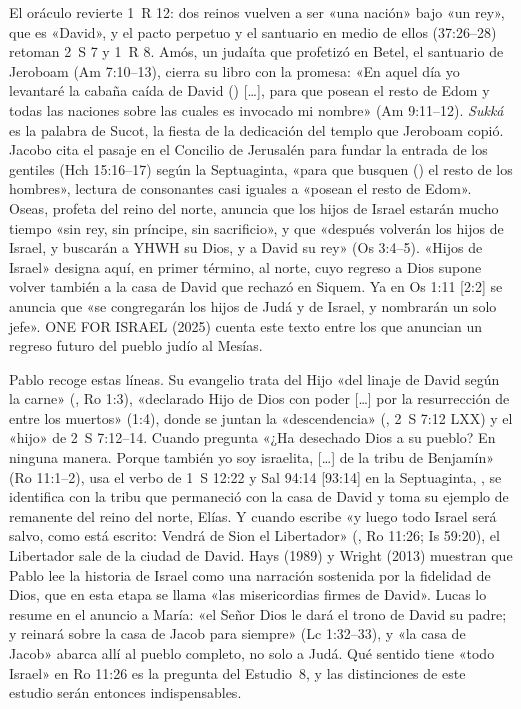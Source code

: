 El oráculo revierte 1~R 12: dos reinos vuelven a ser «una nación» bajo «un rey», que es «David», y el pacto perpetuo y el santuario en medio de ellos (37:26--28) retoman 2~S 7 y 1~R 8. Amós, un judaíta que profetizó en Betel, el santuario de Jeroboam (Am 7:10--13), cierra su libro con la promesa: «En aquel día yo levantaré la cabaña caída de David () [\ldots], para que posean el resto de Edom y todas las naciones sobre las cuales es invocado mi nombre» (Am 9:11--12). \emph{Sukká} es la palabra de Sucot, la fiesta de la dedicación del templo que Jeroboam copió. Jacobo cita el pasaje en el Concilio de Jerusalén para fundar la entrada de los gentiles (Hch 15:16--17) según la Septuaginta, «para que busquen () el resto de los hombres», lectura de consonantes casi iguales a «posean el resto de Edom». Oseas, profeta del reino del norte, anuncia que los hijos de Israel estarán mucho tiempo «sin rey, sin príncipe, sin sacrificio», y que «después volverán los hijos de Israel, y buscarán a YHWH su Dios, y a David su rey» (Os 3:4--5). «Hijos de Israel» designa aquí, en primer término, al norte, cuyo regreso a Dios supone volver también a la casa de David que rechazó en Siquem. Ya en Os 1:11 [2:2] se anuncia que «se congregarán los hijos de Judá y de Israel, y nombrarán un solo jefe». ONE FOR ISRAEL (2025) cuenta este texto entre los que anuncian un regreso futuro del pueblo judío al Mesías.

Pablo recoge estas líneas. Su evangelio trata del Hijo «del linaje de David según la carne» (, Ro 1:3), «declarado Hijo de Dios con poder [\ldots] por la resurrección de entre los muertos» (1:4), donde se juntan la «descendencia» (, 2~S 7:12 LXX) y el «hijo» de 2~S 7:12--14. Cuando pregunta «¿Ha desechado Dios a su pueblo? En ninguna manera. Porque también yo soy israelita, [\ldots] de la tribu de Benjamín» (Ro 11:1--2), usa el verbo de 1~S 12:22 y Sal 94:14 [93:14] en la Septuaginta, , se identifica con la tribu que permaneció con la casa de David y toma su ejemplo de remanente del reino del norte, Elías. Y cuando escribe «y luego todo Israel será salvo, como está escrito: Vendrá de Sion el Libertador» (, Ro 11:26; Is 59:20), el Libertador sale de la ciudad de David. Hays (1989) y Wright (2013) muestran que Pablo lee la historia de Israel como una narración sostenida por la fidelidad de Dios, que en esta etapa se llama «las misericordias firmes de David». Lucas lo resume en el anuncio a María: «el Señor Dios le dará el trono de David su padre; y reinará sobre la casa de Jacob para siempre» (Lc 1:32--33), y «la casa de Jacob» abarca allí al pueblo completo, no solo a Judá. Qué sentido tiene «todo Israel» en Ro 11:26 es la pregunta del Estudio~8, y las distinciones de este estudio serán entonces indispensables.

